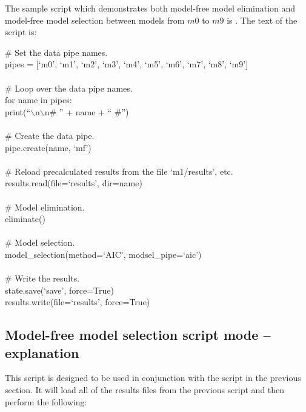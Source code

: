 \begin{htmlonly}
\begin{htmlonly}
The sample script which demonstrates both model-free model elimination and model-free model selection between models from $m0$ to $m9$ is .  The text of the script is:

\begin{exampleenv}
\# Set the data pipe names. \\
pipes = [`m0', `m1', `m2', `m3', `m4', `m5', `m6', `m7', `m8', `m9'] \\
 \\
\# Loop over the data pipe names. \\
for name in pipes: \\
\hspace*{4ex} print(``$\backslash$n$\backslash$n\# '' + name + `` \#'') \\
 \\
\hspace*{4ex} \# Create the data pipe. \\
\hspace*{4ex} pipe.create(name, `mf') \\
 \\
\hspace*{4ex} \# Reload precalculated results from the file `m1/results', etc. \\
\hspace*{4ex} results.read(file=`results', dir=name) \\
 \\
\# Model elimination. \\
eliminate() \\
 \\
\# Model selection. \\
model\_selection(method=`AIC', modsel\_pipe=`aic') \\
 \\
\# Write the results. \\
state.save(`save', force=True) \\
results.write(file=`results', force=True)
\end{exampleenv}



\subsection{Model-free model selection script mode -- explanation}

This script is designed to be used in conjunction with the  script in the previous section.  It will load all of the results files from the previous script and then perform the following:


\end{htmlonly}
\end{htmlonly}
